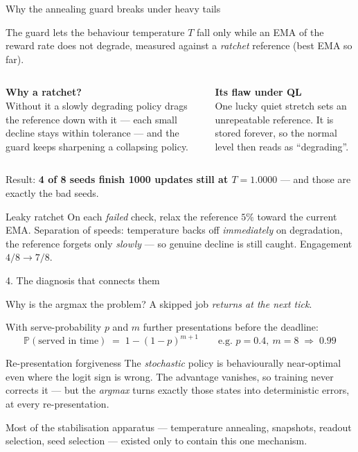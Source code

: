\documentclass[11pt,aspectratio=169]{beamer}
\newcommand{\good}[1]{\textbf{#1}}
\newcommand{\Prob}{\mathbb{P}}
\begin{document}
\begin{frame}{Why the annealing guard breaks under heavy tails}

The guard lets the behaviour temperature $T$ fall only while an EMA of the
reward rate does not degrade, measured against a \emph{ratchet} reference (best
EMA so far).

\vfill
\begin{columns}[T]
\textbf{Why a ratchet?} \\[2pt]
Without it a slowly degrading policy drags the reference down with it --- each
small decline stays within tolerance --- and the guard keeps sharpening a
collapsing policy.

\textbf{Its flaw under QL} \\[2pt]
One lucky quiet stretch sets an unrepeatable reference.  It is stored forever,
so the normal level then reads as ``degrading''.
\end{columns}

\vfill
Result: \good{4 of 8 seeds finish 1000 updates still at $T = 1.0000$} --- and
those are exactly the bad seeds.

\vfill
\begin{block}{Leaky ratchet}
On each \emph{failed} check, relax the reference $5\%$ toward the current EMA.
Separation of speeds: temperature backs off \emph{immediately} on degradation,
the reference forgets only \emph{slowly} --- so genuine decline is still caught.
Engagement $4/8 \to 7/8$.
\end{block}

\end{frame}

\begin{frame}{4. The diagnosis that connects them}

Why is the argmax the problem?  A skipped job \emph{returns at the next tick}.

\vfill
With serve-probability $p$ and $m$ further presentations before the deadline:
\[
  \Prob(\text{served in time}) \;=\; 1-(1-p)^{m+1}
  \qquad\text{e.g. } p = 0.4,\ m = 8 \;\Rightarrow\; 0.99
\]

\vfill
\begin{block}{Re-presentation forgiveness}
The \emph{stochastic} policy is behaviourally near-optimal even where the logit
sign is wrong.  The advantage vanishes, so training never corrects it --- but the
\emph{argmax} turns exactly those states into deterministic errors, at every
re-presentation.
\end{block}

\vfill
Most of the stabilisation apparatus --- temperature annealing, snapshots, readout
selection, seed selection --- existed only to contain this one mechanism.

\end{frame}
\end{document}
